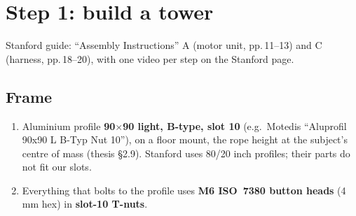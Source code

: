 \section{Step 1: build a tower}\label{sec:walk-tower}
Stanford guide: ``Assembly Instructions'' A (motor unit, pp.\,11--13) and C (harness, pp.\,18--20), with
one video per step on the Stanford page.

\subsection{Frame}
\begin{enumerate}
\item Aluminium profile \textbf{90$\times$90 light, B-type, slot 10} (e.g.\ Motedis ``Aluprofil 90x90 L B-Typ
Nut 10''), on a floor mount, the rope height at the subject's centre of mass (thesis §2.9). Stanford uses
80/20 inch profiles; their parts do not fit our slots.
\item Everything that bolts to the profile uses \textbf{M6 ISO~7380 button heads} (4\,mm hex) in
\textbf{slot-10 T-nuts}.
\end{enumerate}

